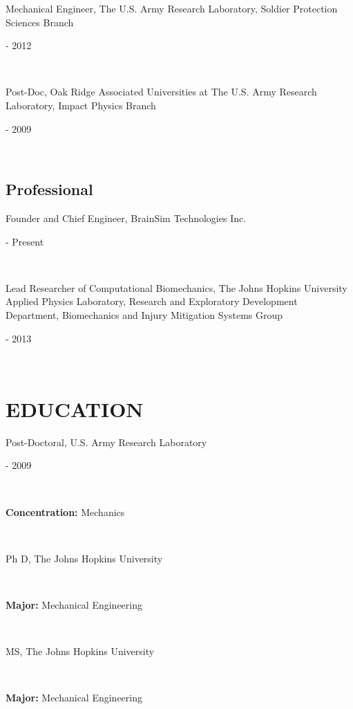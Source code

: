 \documentclass[a4paper,10pt]{article}
\begin{document}
            \noindent \parbox[t]{0.8\linewidth}{\raggedright Mechanical Engineer, The U.S. Army Research Laboratory, Soldier Protection Sciences Branch} \hfill \parbox[t]{0.2\linewidth}{ - 2012} \\
            
            \noindent \parbox[t]{0.8\linewidth}{\raggedright Post-Doc, Oak Ridge Associated Universities at The U.S. Army Research Laboratory, Impact Physics Branch} \hfill \parbox[t]{0.2\linewidth}{ - 2009} \\
            
    \subsection*{Professional}
    
            \noindent \parbox[t]{0.8\linewidth}{\raggedright Founder and Chief Engineer, BrainSim Technologies Inc.} \hfill \parbox[t]{0.2\linewidth}{ - Present} \\
            
            \noindent \parbox[t]{0.8\linewidth}{\raggedright Lead Researcher of Computational Biomechanics, The Johns Hopkins University Applied Physics Laboratory, Research and Exploratory Development Department, Biomechanics and Injury Mitigation Systems Group} \hfill \parbox[t]{0.2\linewidth}{ - 2013} \\
            

    \section*{EDUCATION}
    
            \noindent \parbox[t]{0.8\linewidth}{\raggedright Post-Doctoral, U.S. Army Research Laboratory} \hfill \parbox[t]{0.2\linewidth}{ - 2009} \\
            \noindent \parbox[t]{0.8\linewidth}{\raggedright \textbf{Concentration:} Mechanics} \\
            
            \noindent \parbox[t]{0.8\linewidth}{\raggedright Ph D, The Johns Hopkins University} \hfill \parbox[t]{0.2\linewidth}{} \\
            \noindent \parbox[t]{0.8\linewidth}{\raggedright \textbf{Major:} Mechanical Engineering} \\
            
            \noindent \parbox[t]{0.8\linewidth}{\raggedright MS, The Johns Hopkins University} \hfill \parbox[t]{0.2\linewidth}{} \\
            \noindent \parbox[t]{0.8\linewidth}{\raggedright \textbf{Major:} Mechanical Engineering} \\
            
\end{document}
